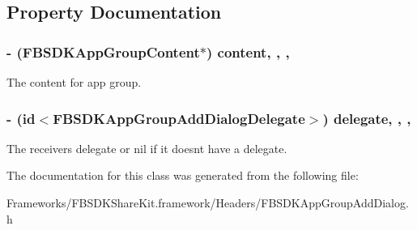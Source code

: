 \subsection{Property Documentation}
\hypertarget{interface_f_b_s_d_k_app_group_add_dialog_a2a7109b4320ff393d28fff95e6bff301}{}
\subsubsection[{content}]{\setlength{\rightskip}{0pt plus 5cm}-\/ ({\bf F\+B\+S\+D\+K\+App\+Group\+Content}$\ast$) content\hspace{0.3cm}{\ttfamily [read]}, {\ttfamily [write]}, {\ttfamily [nonatomic]}, {\ttfamily [copy]}}\label{interface_f_b_s_d_k_app_group_add_dialog_a2a7109b4320ff393d28fff95e6bff301}
The content for app group. \hypertarget{interface_f_b_s_d_k_app_group_add_dialog_a0a92aa54b858fdf0f62b6d98bc09ab80}{}
\subsubsection[{delegate}]{\setlength{\rightskip}{0pt plus 5cm}-\/ (id$<${\bf F\+B\+S\+D\+K\+App\+Group\+Add\+Dialog\+Delegate}$>$) delegate\hspace{0.3cm}{\ttfamily [read]}, {\ttfamily [write]}, {\ttfamily [nonatomic]}, {\ttfamily [weak]}}\label{interface_f_b_s_d_k_app_group_add_dialog_a0a92aa54b858fdf0f62b6d98bc09ab80}
The receiver\textquotesingle{}s delegate or nil if it doesn\textquotesingle{}t have a delegate. 

The documentation for this class was generated from the following file\+:\begin{DoxyCompactItemize}
\item 
Frameworks/\+F\+B\+S\+D\+K\+Share\+Kit.\+framework/\+Headers/F\+B\+S\+D\+K\+App\+Group\+Add\+Dialog.\+h\end{DoxyCompactItemize}
